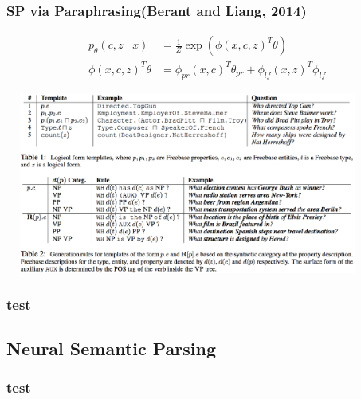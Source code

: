 \documentclass{beamer}
\begin{document}
\begin{frame}
    \frametitle{SP via Paraphrasing(Berant and Liang, 2014)}
    \begin{align*}
        p_\theta(c, z\mid x) &= \frac{1}{Z}\exp(\phi(x,c,z)^T\theta) \\
        \phi(x,c,z)^T\theta &= \phi_{pr}(x,c)^T\theta_{pr} + \phi_{lf}(x,z)^T\phi_{lf}
    \end{align*}

    \begin{center}
        \includegraphics[width=12cm,height=6cm]{img/paraphrase-template.png}
    \end{center}
\end{frame}

\begin{frame}
    \frametitle{test}
\end{frame}

\subsection{Neural Semantic Parsing}
\begin{frame}
    \frametitle{test}
\end{frame}
\end{document}
